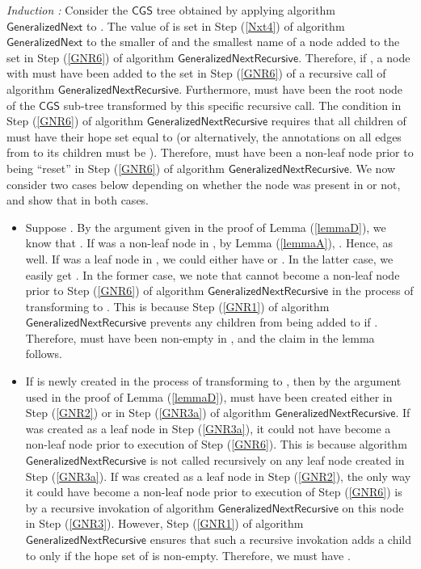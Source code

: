 \documentclass[3p]{elsarticle}
\newcommand{\CGS}{\ensuremath{\textsf{CGS }}}
\newcommand{\algo}[1]{\ensuremath{\textsf{{#1}}}}
\begin{document}
\noindent \emph{Induction :} Consider the \CGS tree  obtained
by applying algorithm \algo{GeneralizedNext} to .  The value of
 is set in Step (\ref{Nxt4}) of algorithm
\algo{GeneralizedNext} to the smaller of  and the smallest name
of a node added to the set  in Step (\ref{GNR6}) of algorithm
\algo{GeneralizedNextRecursive}.  Therefore, if , a
node  with  must have been added to the set
 in Step (\ref{GNR6}) of a recursive call of algorithm
\algo{GeneralizedNextRecursive}.  Furthermore,  must have been the
root node of the \CGS sub-tree transformed by this specific recursive
call.  The condition in Step (\ref{GNR6}) of algorithm
\algo{GeneralizedNextRecursive} requires that all children of  must
have their hope set equal to  (or alternatively, the
annotations on all edges from  to its children must be ).
Therefore,  must have been a non-leaf node prior to being ``reset''
in Step (\ref{GNR6}) of algorithm \algo{GeneralizedNextRecursive}.  We
now consider two cases below depending on whether the node  was
present in  or not, and show that  in
both cases.
\begin{itemize}
\item Suppose .  By the argument given in the
  proof of Lemma (\ref{lemmaD}), we know that .
  If  was a non-leaf node in , by Lemma (\ref{lemmaA}),
  .  Hence,  as
  well.  If  was a leaf node in , we could either have  or .  In the latter case, we
  easily get .  In the former
  case, we note that  cannot become a non-leaf node prior to Step
  (\ref{GNR6}) of algorithm \algo{GeneralizedNextRecursive} in the
  process of transforming  to .  This is because Step
  (\ref{GNR1}) of algorithm \algo{GeneralizedNextRecursive} prevents
  any children from being added to  if .
  Therefore,  must have been non-empty in , and the claim
  in the lemma follows.
\item If  is newly created in the process of transforming  to
  , then by the argument used in the proof of Lemma
  (\ref{lemmaD}),  must have been created either in Step
  (\ref{GNR2}) or in Step (\ref{GNR3a}) of algorithm
  \algo{GeneralizedNextRecursive}.  If  was created as a leaf node
  in Step (\ref{GNR3a}), it could not have become a non-leaf node
  prior to execution of Step (\ref{GNR6}). This is because algorithm
  \algo{GeneralizedNextRecursive} is not called recursively on any
  leaf node created in Step (\ref{GNR3a}).  If  was created as a
  leaf node in Step (\ref{GNR2}), the only way it could have become a
  non-leaf node prior to execution of Step (\ref{GNR6}) is by a
  recursive invokation of algorithm \algo{GeneralizedNextRecursive} on
  this node in Step (\ref{GNR3}).  However, Step (\ref{GNR1}) of
  algorithm \algo{GeneralizedNextRecursive} ensures that such a
  recursive invokation adds a child to  only if the hope set of 
  is non-empty.  Therefore, we must have .
\end{itemize}
\end{document}
